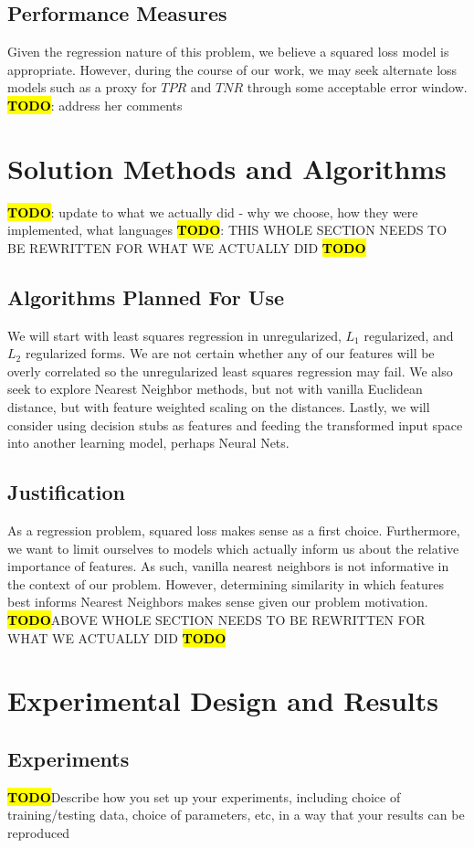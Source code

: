 \documentclass{article}
\newcommand{\TODO}{\textcolor{red}{\textbf{\hl{TODO}}}}
\begin{document}
\begin{multicols}{2}
\subsection{Performance Measures} Given the regression nature of this problem, we believe a squared loss model is appropriate. However, during the course of our work, we may seek alternate loss models such as a proxy for $TPR$ and $TNR$ through some acceptable error window.
\TODO: address her comments

\section{Solution Methods and Algorithms}
\TODO : update to what we actually did - why we choose, how they were implemented, what languages 
\TODO : THIS WHOLE SECTION NEEDS TO BE REWRITTEN FOR WHAT WE ACTUALLY DID \TODO
\subsection{Algorithms Planned For Use} We will start with least squares regression in unregularized, $L_1$ regularized, and $L_2$ regularized forms. We are not certain whether any of our features will be overly correlated so the unregularized least squares regression may fail. We also seek to explore Nearest Neighbor methods, but not with vanilla Euclidean distance, but with feature weighted scaling on the distances. Lastly, we will consider using decision stubs as features and feeding the transformed input space into another learning model, perhaps Neural Nets.
\subsection{Justification} As a regression problem, squared loss makes sense as a first choice. Furthermore, we want to limit ourselves to models which actually inform us about the relative importance of features. As such, vanilla nearest neighbors is not informative in the context of our problem. However, determining similarity in which features best informs Nearest Neighbors makes sense given our problem motivation.
\TODO ABOVE WHOLE SECTION NEEDS TO BE REWRITTEN FOR WHAT WE ACTUALLY DID \TODO

\section{Experimental Design and Results}
\subsection{Experiments}
\TODO Describe how you set up your experiments, including choice
of training/testing data, choice of parameters, etc, in a way that your results can be reproduced

\end{multicols}
\end{document}
